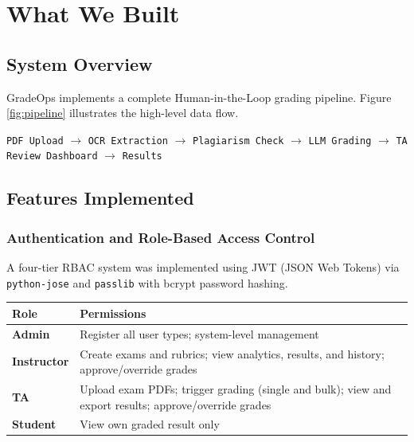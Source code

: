 \documentclass[12pt,a4paper]{article}
\begin{document}
\section{What We Built}

\subsection{System Overview}

GradeOps implements a complete Human-in-the-Loop grading pipeline. Figure \ref{fig:pipeline} illustrates the high-level data flow.

\begin{infobox}
\texttt{PDF Upload} $\rightarrow$ \texttt{OCR Extraction} $\rightarrow$ \texttt{Plagiarism Check} $\rightarrow$ \texttt{LLM Grading} $\rightarrow$ \texttt{TA Review Dashboard} $\rightarrow$ \texttt{Results}
\end{infobox}

\subsection{Features Implemented}

\subsubsection{Authentication and Role-Based Access Control}

A four-tier RBAC system was implemented using JWT (JSON Web Tokens) via \texttt{python-jose} and \texttt{passlib} with bcrypt password hashing.

\begin{center}
\begin{tabular}{lp{9cm}}
\toprule
\textbf{Role} & \textbf{Permissions} \\
\midrule
\textbf{Admin} & Register all user types; system-level management \\
\textbf{Instructor} & Create exams and rubrics; view analytics, results, and history; approve/override grades \\
\textbf{TA} & Upload exam PDFs; trigger grading (single and bulk); view and export results; approve/override grades \\
\textbf{Student} & View own graded result only \\
\bottomrule
\end{tabular}
\end{center}
\end{document}
